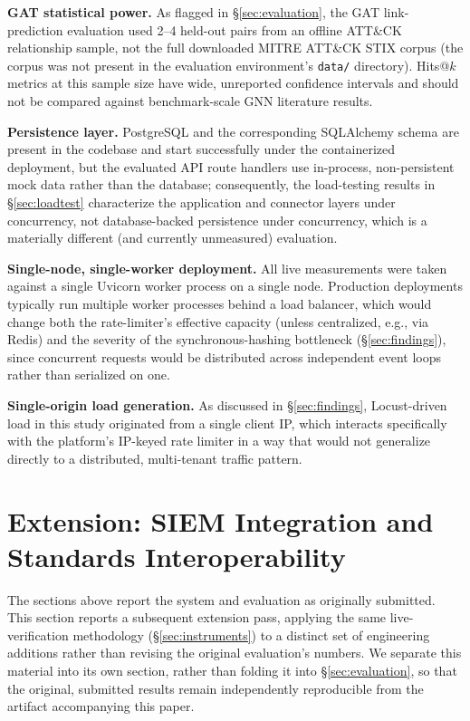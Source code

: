 \documentclass[conference]{IEEEtran}
\begin{document}
\textbf{GAT statistical power.} As flagged in \S\ref{sec:evaluation}, the GAT link-prediction evaluation used 2--4 held-out pairs from an offline ATT\&CK relationship sample, not the full downloaded MITRE ATT\&CK STIX corpus (the corpus was not present in the evaluation environment's \texttt{data/} directory). Hits@$k$ metrics at this sample size have wide, unreported confidence intervals and should not be compared against benchmark-scale GNN literature results.

\textbf{Persistence layer.} PostgreSQL and the corresponding SQLAlchemy schema are present in the codebase and start successfully under the containerized deployment, but the evaluated API route handlers use in-process, non-persistent mock data rather than the database; consequently, the load-testing results in \S\ref{sec:loadtest} characterize the application and connector layers under concurrency, not database-backed persistence under concurrency, which is a materially different (and currently unmeasured) evaluation.

\textbf{Single-node, single-worker deployment.} All live measurements were taken against a single Uvicorn worker process on a single node. Production deployments typically run multiple worker processes behind a load balancer, which would change both the rate-limiter's effective capacity (unless centralized, e.g., via Redis) and the severity of the synchronous-hashing bottleneck (\S\ref{sec:findings}), since concurrent requests would be distributed across independent event loops rather than serialized on one.

\textbf{Single-origin load generation.} As discussed in \S\ref{sec:findings}, Locust-driven load in this study originated from a single client IP, which interacts specifically with the platform's IP-keyed rate limiter in a way that would not generalize directly to a distributed, multi-tenant traffic pattern.

\section{Extension: SIEM Integration and Standards Interoperability}
\label{sec:extension}
The sections above report the system and evaluation as originally submitted. This section reports a subsequent extension pass, applying the same live-verification methodology (\S\ref{sec:instruments}) to a distinct set of engineering additions rather than revising the original evaluation's numbers. We separate this material into its own section, rather than folding it into \S\ref{sec:evaluation}, so that the original, submitted results remain independently reproducible from the artifact accompanying this paper.
\end{document}
